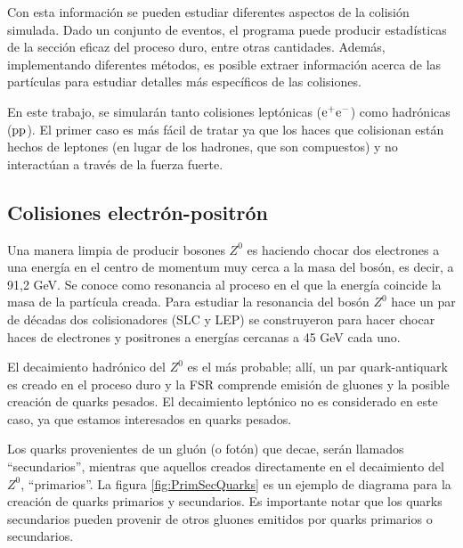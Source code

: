 \documentclass[a4paper,12pt]{article}
\begin{document}
Con esta información se pueden estudiar diferentes aspectos de la colisión simulada. Dado un conjunto de eventos, el programa puede producir estadísticas de la sección eficaz del proceso duro, entre otras cantidades. Además, implementando diferentes métodos, es posible extraer información acerca de las partículas para estudiar detalles más específicos de las colisiones.

En este trabajo, se simularán tanto colisiones leptónicas (${\mathrm e}^+{\mathrm e}^-$) como hadrónicas (${\mathrm p}{\mathrm p}$). El primer caso es más fácil de tratar ya que los haces que colisionan están hechos de leptones (en lugar de los hadrones, que son compuestos) y no interactúan a través de la fuerza fuerte.


\subsection{Colisiones electrón-positrón}


Una manera limpia de producir bosones $Z^0$ es haciendo chocar dos electrones a una energía en el centro de momentum muy cerca a la masa del bosón, es decir, a 91,2 GeV. Se conoce como resonancia al proceso en el que la energía coincide la masa de la partícula creada. Para estudiar la resonancia del bosón $Z^0$ hace un par de décadas dos colisionadores (SLC y LEP) se construyeron para hacer chocar haces de electrones y positrones a energías cercanas a 45 GeV cada uno.

El decaimiento hadrónico del $Z^0$ es el más probable\cite{Beringer:1900zz}; allí, un par quark-antiquark es creado en el proceso duro y la FSR comprende emisión de gluones y la posible creación de quarks pesados. El decaimiento leptónico no es considerado en este caso, ya que estamos interesados en quarks pesados.

Los quarks provenientes de un gluón (o fotón) que decae, serán llamados ``secundarios'', mientras que aquellos creados directamente en el decaimiento del $Z^0$, ``primarios''. La figura \ref{fig:PrimSecQuarks} es un ejemplo de diagrama para la creación de quarks primarios y secundarios. Es importante notar que los quarks secundarios pueden provenir de otros gluones emitidos por quarks primarios o secundarios.
\end{document}
